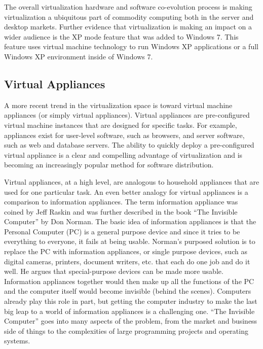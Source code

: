 The overall virtualization hardware and software co-evolution process is making virtualization a ubiquitous part of commodity computing both in the server and desktop markets. Further evidence that virtualization is making an impact on a wider audience is the XP mode feature that was added to Windows 7. This feature uses virtual machine technology to run Windows XP applications or a full Windows XP environment inside of Windows 7\cite{windows_xp_mode}. 

\subsection{Virtual Appliances}
\label{VirtualAppliances}

A more recent trend in the virtualization space is toward virtual machine appliances (or simply virtual appliances). Virtual appliances are pre-configured virtual machine instances that are designed for specific tasks. For example, appliances exist for user-level software, such as browsers, and server software, such as web and database servers. The ability to quickly deploy a pre-configured virtual appliance is a clear and compelling advantage of virtualization and is becoming an increasingly popular method for software distribution.

Virtual appliances, at a high level, are analogous to household appliances that are used for one particular task. An even better analogy for virtual appliances is a comparison to information appliances. The term information appliance was coined by Jeff Raskin and was further described in the book ``The Invisible Computer'' by Don Norman\cite{norman_1999}. The basic idea of information appliances is that the Personal Computer (PC) is a general purpose device and since it tries to be everything to everyone, it fails at being usable. Norman's purposed solution is to replace the PC with information appliances, or single purpose devices, such as digital cameras, printers, document writers, etc. that each do one job and do it well. He argues that special-purpose devices can be made more usable. Information appliances together would then make up all the functions of the PC and the computer itself would become invisible (behind the scenes). Computers already play this role in part, but getting the computer industry to make the last big leap to a world of information appliances is a challenging one. ``The Invisible Computer'' goes into many aspects of the problem, from the market and business side of things to the complexities of large programming projects and operating systems.

